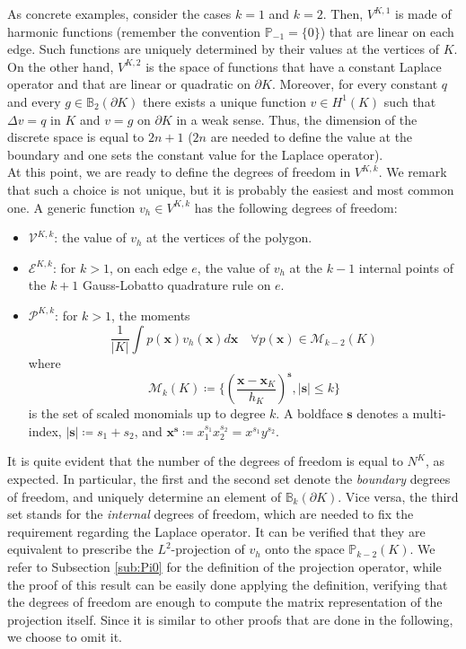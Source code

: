 \documentclass[10pt]{article}
\begin{document}
As concrete examples, consider the cases $k=1$ and $k=2$.
Then, $V^{K,1}$ is made of harmonic functions (remember the convention $\mathbb{P}_{-1}=\lbrace 0 \rbrace$) that are linear on each edge. Such functions are uniquely determined by their values at the vertices of $K$. On the other hand, $V^{K,2}$ is the space of functions that have a constant Laplace operator and that are linear or quadratic on $\partial K$. Moreover, for every constant $q$ and every $g \in \mathbb{B}_2(\partial K)$ there exists a unique function $v \in H^1(K)$ such that $\Delta v=q$ in $K$ and $v=g$ on $\partial K$ in a weak sense. Thus, the dimension of the discrete space is equal to $2n+1$ ($2n$ are needed to define the value at the boundary and one sets the constant value for the Laplace operator). \\
At this point, we are ready to define the degrees of freedom in $V^{K,k}$. We remark that such a choice is not unique, but it is probably the easiest and most common one. A generic function $v_h \in V^{K,k}$ has the following degrees of freedom:
\begin{itemize}
	\item $\mathcal{V}^{K,k}$: the value of $v_h$ at the vertices of the polygon.
	\item $\mathcal{E}^{K,k} $: for $k>1$, on each edge $e$, the value of $v_h$ at the $k-1$ internal points of the $k+1$ Gauss-Lobatto quadrature rule on $e$.
	\item $\mathcal{P}^{K,k}$: for $k>1$, the moments
	$$\frac{1}{|K|} \int p(\mathbf{x})v_h(\mathbf{x})d\mathbf{x} \quad \forall p(\mathbf{x}) \in \mathcal{M}_{k-2}(K)$$
	where $$\mathcal{M}_k(K) \coloneqq \bigg\lbrace \left( \frac{\mathbf{x}-\mathbf{x}_K}{h_K} \right)^\mathbf{s}, |\mathbf{s}|\leq k \bigg\rbrace$$ is the set of scaled monomials up to degree $k$. A boldface $\mathbf{s}$ denotes a multi-index, $|\mathbf{s}| \coloneqq s_1+s_2$, and $\mathbf{x^s}\coloneqq x_1^{s_1}x_2^{s_2} = x^{s_1}y^{s_2}$.
\end{itemize}
It is quite evident that the number of the degrees of freedom is equal to $N^K$, as expected. In particular, the first and the second set denote the \textit{boundary} degrees of freedom, and uniquely determine an element of $\mathbb{B}_k(\partial K)$. Vice versa, the third set stands for the \textit{internal} degrees of freedom, which are needed to fix the requirement regarding the Laplace operator. It can be verified that they are equivalent to prescribe the $L^2$-projection of $v_h$ onto the space $\mathbb{P}_{k-2}(K)$. We refer to Subsection \ref{sub:Pi0} for the definition of the projection operator, while the proof of this result can be easily done applying the definition, verifying that the degrees of freedom are enough to compute the matrix representation of the projection itself. Since it is similar to other proofs that are done in the following, we choose to omit it.\\
\end{document}
